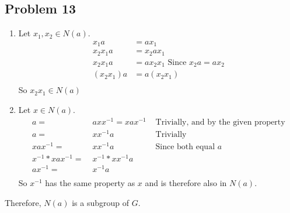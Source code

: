 \documentclass{article}
\begin{document}
    \subsection*{Problem 13}
        \begin{enumerate}
            \item Let \(x_1,x_2 \in N(a)\).
                \begin{align*}
                    x_1a & = ax_1 \\
                    x_2x_1a & = x_2ax_1 \\
                    x_2x_1a & = ax_2x_1 \text{ Since } x_2a = ax_2 \\
                    (x_2x_1)a & = a(x_2x_1) \\
                \end{align*}
                So \(x_2x_1 \in N(a)\)
            \item Let \(x \in N(a)\).
                \begin{align*}
                    a = & \; axx^{-1} = xax^{-1} &
                        \text{ Trivially, and by the given property} \\
                    a = & \; xx^{-1}a            & \text{ Trivially } \\
                    xax^{-1} = & \; xx^{-1}a     & \text{ Since both equal \(a\) }\\
                    x^{-1} * xax^{-1} = & \; x^{-1} * xx^{-1}a \\
                    ax^{-1} = & \; x^{-1}a \\
                \end{align*}
                So \(x^{-1}\) has the same property as \(x\) and is therefore also in
                \(N(a)\).
        \end{enumerate}
        Therefore, \(N(a)\) is a subgroup of \(G\).
\end{document}
